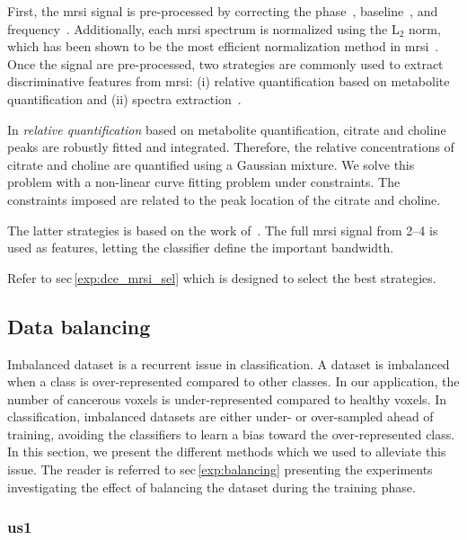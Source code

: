 \documentclass[final,3p,times,twocolumn]{elsarticle}
\begin{document}
First, the \ac{mrsi} signal is pre-processed by correcting the
phase~\cite{Chen2002}, baseline~\cite{xi2008baseline}, and
frequency~\cite{Parfait2012}. Additionally, each \ac{mrsi} spectrum is
normalized using the L$_2$ norm, which has been shown to be the most efficient
normalization method in \ac{mrsi}~\cite{Parfait2012}.  Once the signal are
pre-processed, two strategies are commonly used to extract discriminative
features from \ac{mrsi}: (i) relative quantification based on metabolite
quantification and (ii) spectra extraction~\cite{Parfait2012}.

In \emph{relative quantification} based on metabolite quantification, citrate
and choline peaks are robustly fitted and integrated. Therefore, the relative
concentrations of citrate and choline are quantified using a Gaussian
mixture. We solve this problem with a non-linear curve fitting problem under
constraints. The constraints imposed are related to the peak location of the
citrate and choline.

The latter strategies is based on the work of~\cite{Parfait2012}. The full
\ac{mrsi} signal from \SIrange{2}{4}{\ppm} is used as features, letting the
classifier define the important \si{\ppm} bandwidth.

Refer to \acs{sec}\,\ref{exp:dce_mrsi_sel} which is designed to select the best
strategies.

\subsection{Data balancing}\label{features:balancing}

Imbalanced dataset is a recurrent issue in classification. A dataset is
imbalanced when a class is over-represented compared to other classes. In our
application, the number of cancerous voxels is under-represented compared to
healthy voxels. In classification, imbalanced datasets are either under- or
over-sampled ahead of training, avoiding the classifiers to learn a bias toward
the over-represented class. In this section, we present the different methods
which we used to alleviate this issue. The reader is referred to
\acs{sec}\,\ref{exp:balancing} presenting the experiments investigating the
effect of balancing the dataset during the training phase.

\subsubsection{\Acl*{us1}}
\end{document}
